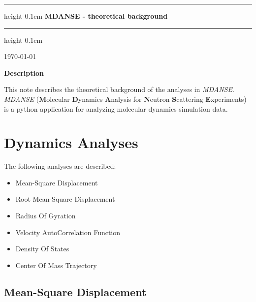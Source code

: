 \documentclass[a4paper,11pt]{article}
\begin{document}
\begin{titlepage}

\begin{center}

\vspace{2cm}
 
\hrule height 0.1cm
\vspace{0.5cm}
{\Huge \bfseries MDANSE - theoretical background}\\
\vspace{0.5cm}
\hrule height 0.1cm

\vspace{1.0cm}
 
{\large \today}\\

\vspace{1.0cm}

{\large \textbf{Description}}\\

\end{center}

\noindent This note describes the theoretical background of the analyses in \textit{MDANSE}. \textit{MDANSE} (\textbf{M}olecular \textbf{D}ynamics \textbf{A}nalysis 
for \textbf{N}eutron \textbf{S}cattering \textbf{E}xperiments) is a python application for analyzing molecular dynamics simulation data.


\end{titlepage}

\tableofcontents{}

\newpage

\section{Dynamics Analyses}
\label{dynamics_menu}
The following analyses are described:
\begin{itemize}
\item Mean-Square Displacement
\item Root Mean-Square Displacement
\item Radius Of Gyration
\item Velocity AutoCorrelation Function
\item Density Of States
\item Center Of Mass Trajectory
\end{itemize}

\subsection{Mean-Square Displacement}
\label{msd}
\end{document}
